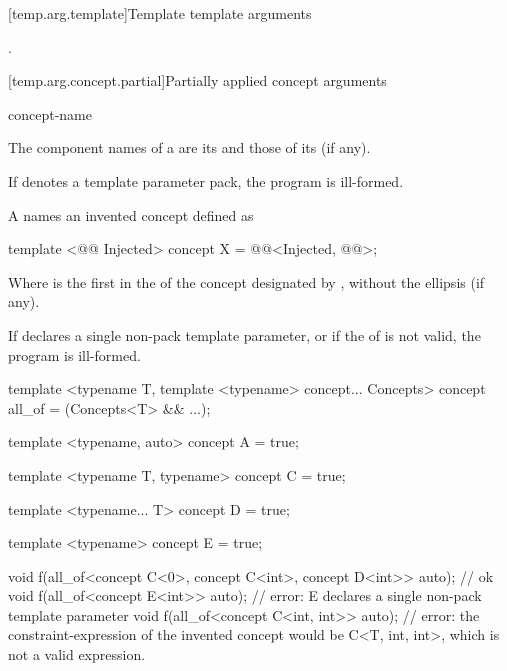 \documentclass{wg21}
\begin{document}
[temp.arg.template]{Template template arguments}

 .

\begin{addedblock}

[temp.arg.concept.partial]{Partially applied concept arguments}


\begin{bnf}
    \br
      concept-name \terminal{<}  \terminal{>}
\end{bnf}


\pnum
The component names of a  are
its  and
those of its  (if any).

If  denotes a template parameter pack, the program is ill-formed.

A  names an invented concept  defined as

\begin{codeblock}
template <@@ Injected>
concept X = @@<Injected, @@>;
\end{codeblock}

Where  is the first  in the   of the concept designated by , without the ellipsis (if any).

If  declares a single non-pack template parameter, or if the  of  is not valid, the program is ill-formed.

\begin{example}
\begin{colorblock}
template <typename T, template <typename> concept... Concepts>
concept all_of  = (Concepts<T> && ...);

template <typename, auto>
concept A = true;

template <typename T, typename>
concept C = true;

template <typename... T>
concept D = true;

template <typename>
concept E = true;

void f(all_of<concept C<0>, concept C<int>, concept D<int>> auto); // ok
void f(all_of<concept E<int>> auto); // error: E declares a single non-pack template parameter
void f(all_of<concept C<int, int>> auto); // error: the constraint-expression of the invented concept would be C<T, int, int>, which is not a valid expression.

\end{colorblock}
\end{example}

\end{addedblock}
\end{document}
